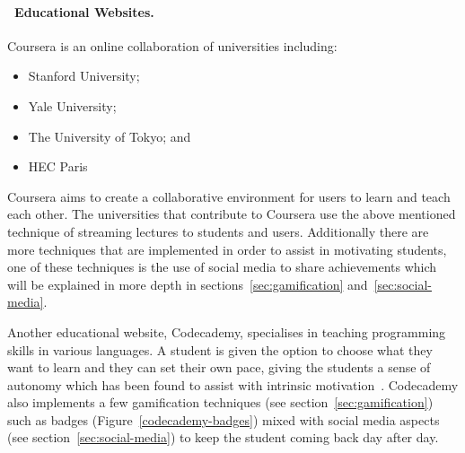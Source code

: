 \documentclass[a4paper,12pt]{article}
\begin{document}
\paragraph{\indent~Educational Websites.} 
Coursera is an online collaboration of universities including: 
\begin{itemize}
	\item{Stanford University;}
	\item{Yale University;}
	\item{The University of Tokyo; and}
	\item{HEC Paris}
\end{itemize}
Coursera aims to create a collaborative environment for users to learn and teach each other. The universities that contribute to Coursera use the above mentioned technique of streaming lectures to students and users. Additionally there are more techniques that are implemented in order to assist in motivating students, one of these techniques is the use of social media to share achievements which will be explained in more depth in sections~\ref{sec:gamification} and~\ref{sec:social-media}.

\par
Another educational website, Codecademy, specialises in teaching programming skills in various languages. A student is given the option to choose what they want to learn and they can set their own pace, giving the students a sense of autonomy which has been found to assist with intrinsic motivation~\citep{bread-and-games}. Codecademy also implements a few gamification techniques (see section~\ref{sec:gamification}) such as badges (Figure~\ref{codecademy-badges}) mixed with social media aspects (see section~\ref{sec:social-media}) to keep the student coming back day after day.	
\end{document}
